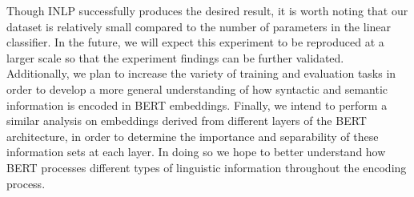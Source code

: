 \documentclass[11pt,a4paper]{article}
\begin{document}

Though INLP successfully produces the desired result, it is worth noting that our dataset is relatively small compared to the number of parameters in the linear classifier. In the future, we will expect this experiment to be reproduced at a larger scale so that the experiment findings can be further validated. Additionally, we plan to increase the variety of training and evaluation tasks in order to develop a more general understanding of how syntactic and semantic information is encoded in BERT embeddings. Finally, we intend to perform a similar analysis on embeddings derived from different layers of the BERT architecture, in order to determine the importance and separability of these information sets at each layer. In doing so we hope to better understand how BERT processes different types of linguistic information throughout the encoding process.


















\end{document}

